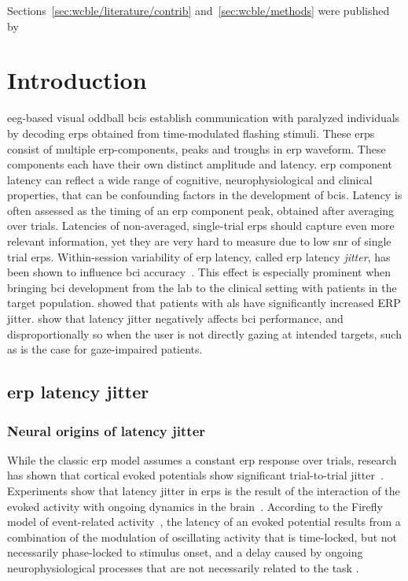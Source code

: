 Sections~\ref{sec:wcble/literature/contrib} and~\ref{sec:wcble/methods} were published
by~\textcite{VanDenKerchove2024}

\section{Introduction}
\label{sec:wcble/intro}

\Ac{eeg}-based visual oddball \acp{bci} establish communication with paralyzed
individuals by decoding \acp{erp} obtained from time-modulated flashing
stimuli.
These \acp{erp} consist of multiple \ac{erp}-components, peaks and troughs in
\ac{erp} waveform.
These components each have their own distinct amplitude and latency.
\Ac{erp} component latency can reflect a wide range of cognitive,
neurophysiological and clinical properties, that can be confounding factors in
the development of \acp{bci}.
Latency is often assessed as the timing of an \ac{erp} component peak, obtained
after averaging over trials.
Latencies of non-averaged, single-trial \acp{erp} should capture even more
relevant information, yet they are very hard to measure due to low \ac{snr} of
single trial \acp{erp}.
Within-session variability of \ac{erp} latency, called \ac{erp} latency
\emph{jitter}, has been shown to influence \ac{bci}
accuracy~\cite{Thompson2012}.
This effect is especially prominent when bringing \ac{bci} development from the
lab to the clinical setting with patients in the target population.
\textcite{Zisk2021} showed that patients with \ac{als} have significantly
increased ERP jitter.
\textcite{Arico2014} show that latency jitter negatively affects \ac{bci}
performance, and disproportionally so when the user is not directly gazing at
intended targets, such as is the case for gaze-impaired patients.

\subsection{\Ac{erp} latency jitter}

\subsubsection{Neural origins of latency jitter}
While the classic \ac{erp} model assumes a constant \ac{erp} response over trials,
research has shown that cortical evoked potentials show significant
trial-to-trial jitter~\cite{Truccolo2002}.
Experiments show that latency jitter in \acp{erp} is the result of the interaction of
the evoked activity with ongoing dynamics in the brain~\cite{Hasenstaub2007,
	Kisley1999, Curto2009, Arieli1996}.
According to the Firefly model of event-related activity~\cite{Burgess2012},
the latency of an evoked potential results from a combination of the modulation
of oscillating activity that is time-locked, but not necessarily phase-locked to stimulus onset,
and a delay caused by ongoing neurophysiological processes that are not necessarily related to the task
\cite{Stokes2016,Mouraux2008}.


